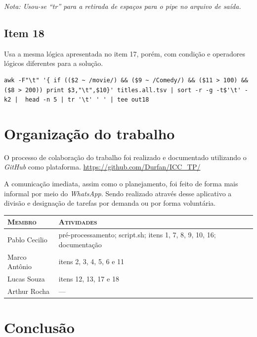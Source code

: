 \documentclass[12pt]{article}
\begin{document}
\textit{Nota: Usou-se ``tr'' para a retirada de espaços para o pipe no arquivo de saída.}

\subsection*{Item 18}

Usa a mesma lógica apresentada no item 17, porém, com condição e operadores lógicos diferentes para a solução.

\begin{verbatim}
awk -F"\t" '{ if (($2 ~ /movie/) && ($9 ~ /Comedy/) && ($11 > 100) && ($8 > 200)) print $3,"\t",$10}' titles.all.tsv | sort -r -g -t$'\t' -k2 |  head -n 5 | tr '\t' ' ' | tee out18
\end{verbatim}

\section{Organização do trabalho}

O processo de colaboração do trabalho foi realizado e documentado utilizando o \textit{GitHub} como plataforma. \url{https://github.com/Durfan/ICC_TP/}

A comunicação imediata, assim como o planejamento, foi feito de forma mais informal por meio do \textit{WhatsApp}. Sendo realizado através desse aplicativo a divisão e designação de tarefas por demanda ou por forma voluntária.

\begin{table}[!h]
    \begin{tabular}{p{5cm}p{7.5cm}}
    
        \textsc{Membro}      & \textsc{Atividades} \\ 
	    \hline
        Pablo Cecilio & pré-processamento; script.sh; itens 1, 7, 8, 9, 10, 16; documentação \\ 
        Marco Antônio & itens 2, 3, 4, 5, 6 e 11 \\
        Lucas Souza & itens 12, 13, 17 e 18 \\
        Arthur Rocha & --- \\

    \end{tabular}
\end{table}

\section{Conclusão}
\end{document}
